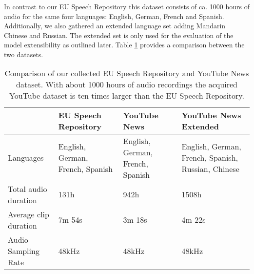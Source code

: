   	In contrast to our EU Speech Repository this dataset consists of ca. 1000 hours of audio  for the same four languages: English, German, French and Spanish. Additionally, we also gathered an extended language set adding Mandarin Chinese and Russian. The extended set is only used for the evaluation of the model extensibility as outlined later. Table \ref{tab:dataset_comparison} provides a comparison between the two datasets.
  	
  	
\begin{table}[]
\centering
\begin{tabularx}{\textwidth}{lXXX}
\toprule
               & EU Speech Repository & YouTube News & YouTube News \mbox{Extended} \\ 
\midrule
Languages             & English, German, French, Spanish & English, German, French, Spanish & English, German, French, Spanish, Russian, Chinese \\
Total audio duration  & 131h   & 942h   & 1508h   \\
Average clip duration & 7m 54s & 3m 18s & 4m 22s  \\
Audio Sampling Rate   & 48kHz  & 48kHz  & 48kHz   \\ 
\bottomrule
\end{tabularx}
\caption{Comparison of our collected EU Speech Repository and YouTube News dataset. With about 1000 hours of audio recordings the acquired YouTube dataset is ten times larger than the EU Speech Repository.}
\label{tab:dataset_comparison}
\end{table}




